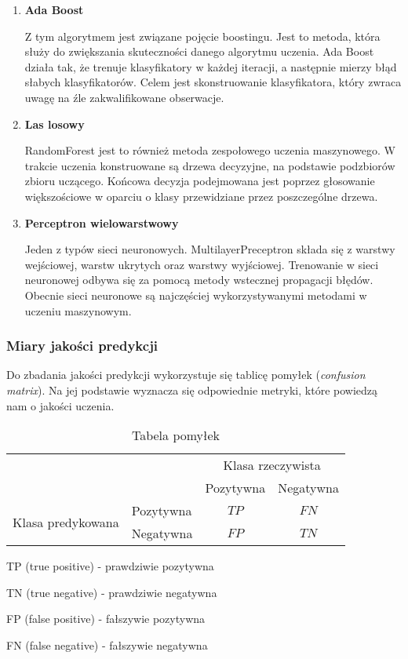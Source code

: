 \documentclass[polish,12pt]{aghthesis}
\begin{document}
\begin{enumerate}
    
    \item \textbf{Ada Boost}
    
    Z tym algorytmem jest związane pojęcie boostingu. Jest to metoda, która służy do zwiększania skuteczności danego algorytmu uczenia. Ada Boost\cite{ada} działa tak, że trenuje klasyfikatory w każdej iteracji, a następnie mierzy błąd słabych klasyfikatorów. Celem jest skonstruowanie klasyfikatora, który zwraca uwagę na źle zakwalifikowane obserwacje.
    
    
    \item \textbf{Las losowy}
    
    RandomForest\cite{random} jest to również metoda zespołowego uczenia maszynowego. W trakcie uczenia konstruowane są drzewa decyzyjne, na podstawie podzbiorów zbioru uczącego. Końcowa decyzja podejmowana jest poprzez głosowanie większościowe w oparciu o klasy przewidziane przez poszczególne drzewa.
    
    
    \item \textbf{Perceptron wielowarstwowy}
    
    Jeden z typów sieci neuronowych. MultilayerPreceptron\cite{mlp} składa się z warstwy wejściowej, warstw ukrytych oraz warstwy wyjściowej. Trenowanie w sieci neuronowej odbywa się za pomocą metody wstecznej propagacji błędów. Obecnie sieci neuronowe są najczęściej wykorzystywanymi metodami w uczeniu maszynowym.
\end{enumerate}

\subsubsection{Miary jakości predykcji}

Do zbadania jakości predykcji wykorzystuje się tablicę pomyłek (\textit{confusion matrix}). Na jej podstawie wyznacza się odpowiednie metryki, które powiedzą nam o jakości uczenia.

\begin{table}[h]
\centering
\begin{tabular}{l|l|c|c|}
\multicolumn{2}{c}{}&\multicolumn{2}{c}{Klasa rzeczywista}\\
\cline{3-4}
\multicolumn{2}{c|}{}&Pozytywna&Negatywna\\
\cline{2-4}
\multirow{2}{*}{Klasa predykowana}& Pozytywna & $TP$ & $FN$ \\
\cline{2-4}
& Negatywna & $FP$ & $TN$ \\
\cline{2-4}

\end{tabular}
\caption[Tablica pomyłek]{Tabela pomyłek}
\begin{description}
\item TP (true positive) - prawdziwie pozytywna
\item TN (true negative) - prawdziwie negatywna
\item FP (false positive) - fałszywie pozytywna
\item FN (false negative) - fałszywie negatywna
\end{description}
\end{table}
\end{document}
